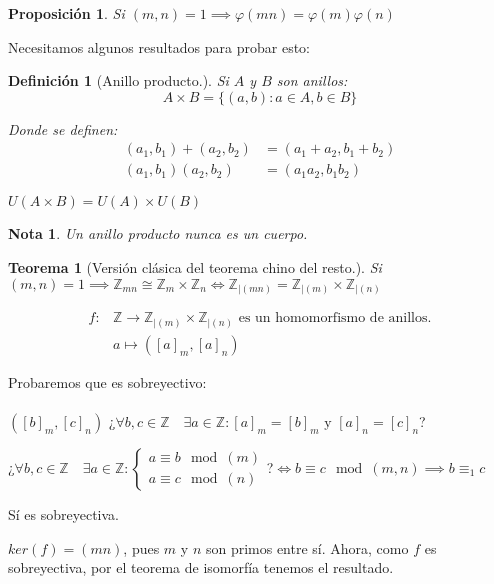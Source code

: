 \documentclass[11pt, a4paper, titlepage]{article}
\makeatletter
\renewenvironment{proof}[1][\proofname] {\vspace{-15pt}\par\pushQED{\qed}\normalfont\topsep6\p@\@plus6\p@\relax\trivlist\item[\hskip\labelsep\it#1\@addpunct{.}]\ignorespaces}{\popQED\endtrivlist\@endpefalse}
\theoremstyle{theorem-style}
\newtheorem*{nth}{Teorema}
\newtheorem*{nprop}{Proposición}
\theoremstyle{definition-style}
\newtheorem*{ndef}{Definición}
\theoremstyle{remark-style}
\newtheorem*{nota}{Nota}
\theoremstyle{example-style}
\makeatother
\begin{document}
\begin{nprop}
  Si $(m,n) = 1 \implies \varphi(mn) = \varphi(m)\varphi(n)$
\end{nprop}

Necesitamos algunos resultados para probar esto:

\begin{ndef}[Anillo producto.]
Si $A$ y $B$ son anillos:
\[
  A\times B = \{(a,b) : a\in A, b\in B\}
\]

Donde se definen:
\begin{align*}
  (a_1,b_1)+(a_2,b_2) &= (a_1+a_2, b_1+b_2)\\
  (a_1,b_1)(a_2,b_2) &= (a_1a_2, b_1b_2)
\end{align*}

$U(A\times B) = U(A)\times U(B)$

\end{ndef}

\begin{nota} Un anillo producto nunca es un cuerpo.
  
\end{nota}

\begin{nth}[Versión clásica del teorema chino del resto.]
Si $(m,n)=1 \implies \mathbb{Z}_{mn} \cong \mathbb{Z}_m \times \mathbb{Z}_n \iff \mathbb{Z}_{|(mn)} = \mathbb{Z}_{|(m)} \times \mathbb{Z}_{|(n)}$ 
\end{nth}

\begin{proof}
\begin{align*}
f:& \mathbb{Z} \longrightarrow \mathbb{Z}_{|(m)}\times \mathbb{Z}_{|(n)}\text{ es un homomorfismo de anillos.}\\
& a \longmapsto ([a]_m, [a]_n)
\end{align*}

Probaremos que es sobreyectivo:\\\\
$([b]_m,[c]_n)$ ¿$\forall b,c \in \mathbb{Z}\quad \exists a \in \mathbb{Z} : [a]_m = [b]_m \text{ y } [a]_n = [c]_n$?

¿$\forall b,c \in \mathbb{Z}\quad \exists a \in \mathbb{Z} : \begin{cases}
  a \equiv b \mod(m)\\
  a \equiv c \mod(n)
\end{cases}$?$ \iff b \equiv c \mod(m,n) \implies b \equiv_1 c$

Sí es sobreyectiva.

$ker(f) = (mn)$, pues $m$ y $n$ son primos entre sí. Ahora, como $f$ es sobreyectiva, por el teorema de isomorfía tenemos el resultado.
\end{proof}
\end{document}
